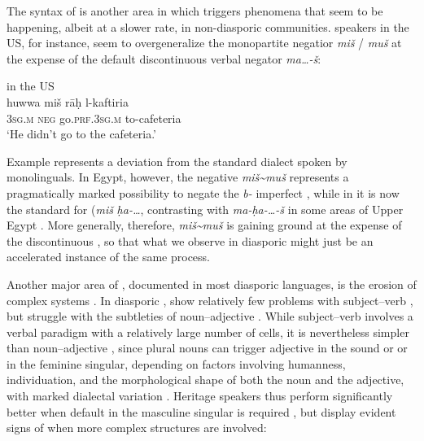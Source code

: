 \documentclass[output=paper]{langsci/langscibook}
\begin{document}
The syntax of  is another area in which  triggers phenomena that seem to be happening, albeit at a slower rate, in non-diasporic communities.  speakers in the US, for instance, seem to overgeneralize the monopartite negatior \textit{miš} / \textit{muš} at the expense of the default discontinuous verbal negator \textit{ma…-š}: 

\ea\label{ex:key:egy}
{  in the US \citep[482]{AlbiriniBenmamoun2015}}\\
\gll huwwa miš rāḥ l-kaftiria\\
     \textsc{3sg.m} \textsc{neg} go.\textsc{prf.3sg.m} to-cafeteria\\
\glt `He didn’t go to the cafeteria.'
\z

Example  represents a deviation from the standard  dialect spoken by monolinguals. In Egypt, however, the negative  \textit{miš{\textasciitilde}muš} represents a pragmatically marked possibility to negate the \textit{b-} imperfect \citep[302]{Brustad2000}, while in  it is now the standard  for   (\textit{miš} \textit{ḥa-…}, contrasting with \textit{ma-ḥa-…-š} in some areas of Upper Egypt \citep[285]{Brustad2000}. More generally, therefore,  \textit{miš{\textasciitilde}muš} is gaining ground at the expense of the discontinuous  \citep[285]{Brustad2000}, so that what we observe in diasporic   might just be an accelerated instance of the same process.

Another major area of , documented in most diasporic languages, is the erosion of complex  systems \citep[192]{GonzoSaltarelli1983}. In diasporic ,  show relatively few problems with subject–verb , but struggle with the subtleties of noun–adjective  \citep[8]{AlbiriniChakrani2013}. While subject--verb  involves a verbal paradigm with a relatively large number of cells, it is nevertheless simpler than noun–adjective , since plural nouns can trigger adjective  in the sound or  or in the feminine singular, depending on factors involving humanness, individuation, and the morphological shape of both the noun and the adjective, with marked dialectal variation \citep[103–104]{Danna2017article}. Heritage speakers thus perform significantly better when default  in the masculine singular is required \citep[8]{AlbiriniChakrani2013}, but display evident signs of  when more complex structures are involved: 
\end{document}
